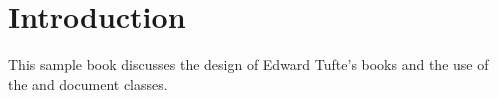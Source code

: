 \cleardoublepage
\chapter{Introduction}

This sample book discusses the design of Edward Tufte's
books\cite{Tufte2001,Tufte1990,Tufte1997,Tufte2006}
and the use of the  and  document classes.
